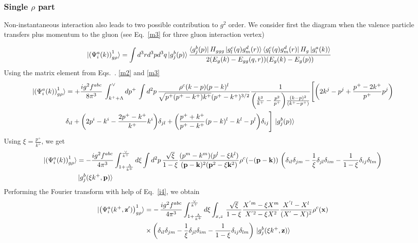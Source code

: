 \documentclass[aps,prd,amsmath,amssymb,nofootinbib]{revtex4-2}
\def\v#1{\mathbf{#1}}
\numberwithin{equation}{section}
\begin{document}
\subsubsection{Single $\rho$ part}
Non-instantaneous interaction also leads to two possible contribution to $g^2$ order. We consider first the diagram when the valence particle transfers plus momentum to the gluon 
(see Eq.~\eqref{m3} for three gluon interaction vertex)
\begin{figure}[h]
\end{figure}
\begin{align}\label{onegrho1}
  \ket{ \left(\Psi^{a}_{i}(k) \right)^{1}_{g \rho} }%
   & =
   \int d^3 r d^3p d^3q %
   \ket{g^{b}_{j}(p)}
   \frac{ \bra{g^{b}_{j}(p)}H_{ggg}\ket{g^{c}_{l}(q)g^{d}_{m}(r)}\bra{g^{c}_{l}(q)g^{d}_{m}(r)}H_{g}\ket{g^{a}_{i}(k)}}
   {2(E_{g}(k)-E_{gg}(q,r))(E_{g}(k)-E_{g}(p))}
   \end{align}
   Using the matrix element from Eqs.~. \eqref{m2} and \eqref{m3}
   \begin{align}\label{onegrho12}
\ket{ \left(\Psi^{a}_{i}(k) \right)^{1}_{g \rho} }   & = +\frac{ig^{2}f^{abc}}{8\pi^{3}}\,\int_{k^{+}+\Lambda}^{\vee} dp^{+}\,\int d^{2}p\,\frac{\rho^{c}(k-p)(p-k)^{l}}{\sqrt{p^{+}(p^{+}-k^{+})k^{+}}(p^{+}-k^{+})^{3/2}} \frac{1}{\bigg(\frac{k^{2}}{k^{+}}-\frac{p^{2}}{p^{+}}\bigg)\frac{(k-p)^{2}}{(k^{+}-p^{+})}}\Bigg[\bigg(2k^{j}-p^{j}+\frac{p^{+}-2k^{+}}{p^{+}}p^{j}\bigg)\notag \\ & \delta_{il} +\bigg(2p^{i}-k^{i}-\frac{2p^{+}-k^{+}}{k^{+}}k^{i}\bigg)\delta_{jl}+\bigg(\frac{p^{+}+k^{+}}{p^{+}-k^{+}}(p-k)^{l} - k^{l} - p^{l}\bigg)\delta_{ij}\Bigg]\,\ket{g^{b}_{j}(p)}
\end{align}
Using $\xi = \frac{p^{+}}{k^{+}}$, we get
\begin{align}
 \ket{ \left(\Psi^{a}_{i}(k) \right)^{1}_{g \rho} } &  = - \frac{ig^2 f^{abc}} {4 \pi^3} 
   \int_{1+ \frac{\Lambda}{k^+}   }^{\frac{\vee}{k^+}} %
   d \xi 
   \int d^2p \,
   \frac{\sqrt{\xi}}{1-\xi} \frac{(p^m-k^m) (p^l -\xi k^l)} {(\v{p}-\v{k})^2 (\v{p}^2 - \xi \v{k}^2)}
   \rho^c(-(\v{p}-\v{k}))\,\left( 
  \delta_{il} \delta_{jm}
  - \frac{1}{\xi}\delta_{jl} \delta_{im}
  - \frac{1}{1-\xi}\delta_{ij} \delta_{lm}
   \right)\notag \\ & \ket{g^{b}_{j}(\xi k^+,\v{p})}
\end{align}
Performing the Fourier transform with help of Eq.~\eqref{i4}, we obtain
\begin{align}%
\label{Eq:onegrhoX1}
  \notag
  \ket{ \left(\Psi^{a}_{i} ( k^+, \v{z}') \right)^{1}_{g \rho} }%
   \notag
   &=
   -\,\frac{ig^2 f^{abc}} {4 \pi^3} 
   \int_{1+ \frac{\Lambda}{k^+}   }^{\frac{\vee}{k^+}} %
   d \xi 
   \int_{x,z}\,
   \frac{\sqrt{\xi}}{1-\xi} 
   \frac{X^{'m} - \xi X^m} {X^{'2} - \xi X^2}
   \frac{X^{'l} -  X^l } {(X^{'} -  X)^2}
   \rho^c(\v{x})
  \notag \\ & \times \left( 
  \delta_{il} \delta_{jm}
  - \frac{1}{\xi}\delta_{jl} \delta_{im}
  - \frac{1}{1-\xi}\delta_{ij} \delta_{lm}
   \right)\,\ket{g^{b}_{j}(\xi k^+,\v{z})}
\end{align}
\end{document}
